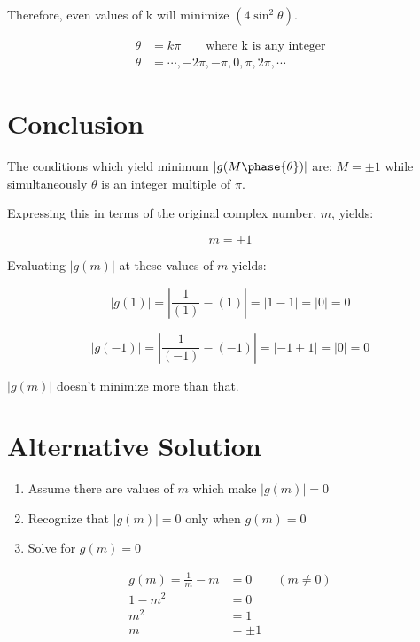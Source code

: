 \documentclass[11pt]{article}
\begin{document}
	Therefore, even values of k will minimize $\left(4\sin^2{\theta}\right)$.
	
	\begin{align}
		\theta &= k\pi \qquad\text{where k is any integer} \\
		\theta &= \cdots, -2\pi, -\pi, 0, \pi, 2\pi, \cdots \nonumber
	\end{align}
	
	
	\newpage
	\section{Conclusion}
	
	The conditions which yield minimum $|g(M\phase{\theta})|$ are: $M = \pm1$ while simultaneously $\theta$ is an integer multiple of $\pi$.
	
	Expressing this in terms of the original complex number, $m$, yields:
	
	\begin{equation}
		m = \pm1
	\end{equation}
	
	Evaluating $|g(m)|$ at these values of $m$ yields:
	
	\begin{equation}
	|g(1)| = \left|\frac{1}{(1)} - (1)\right| = |1 - 1| = |0| = 0
	\end{equation}
	
	\begin{equation}
	|g(-1)| = \left|\frac{1}{(-1)} - (-1)\right| = |-1 + 1| = |0| = 0
	\end{equation}
	
	$|g(m)|$ doesn't minimize more than that.
	
	\section {Alternative Solution}
	
	\begin{enumerate}
		\item Assume there are values of $m$ which make $|g(m)| = 0$ 
		\item Recognize that $|g(m)| = 0$ only when $g(m) = 0$
		\item Solve for $g(m) = 0$
	\end{enumerate}
	
	\begin{align}
		g(m) = \frac{1}{m} - m &= 0 \qquad (m \neq 0) \nonumber \\
		1 - m^2 &= 0 \nonumber \\
		m^2 &= 1 \nonumber \\
		m &= \pm1
	\end{align}
	
\end{document}
